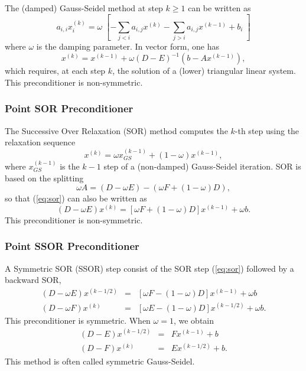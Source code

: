 The (damped) Gauss-Seidel method at step $k \geq 1$ can be written as
\[
a_{i,i} x^{(k)}_i = \omega \; 
 \left[- \sum_{j<i} a_{i,j} x^{(k)} 
			   - \sum_{j>i} a_{i,j} x^{(k-1)} + b_i
			   \; \right]
\]
where $\omega$ is the damping parameter. In vector form, one has
\begin{equation}
\label{eq:gs}
x^{(k)} = x^{(k-1)} + \omega (D - E)^{-1} (b - A x ^{(k-1)} ) ,
\end{equation}
which requires, at each step $k$, the solution of a (lower) triangular 
linear system. This preconditioner is non-symmetric.

\subsubsection{Point SOR Preconditioner}
\label{sec:sor}

The Successive Over Relaxation (SOR) method computes the $k$-th step 
using the relaxation sequence
\begin{equation}
\label{eq:sor}
x^{(k)} = \omega x_{GS}^{(k-1)} + (1 - \omega) x^{(k-1)}, 
\end{equation}
where $x_{GS}^{(k-1)}$ is the $k-1$ step of a (non-damped) Gauss-Seidel
iteration. SOR is based on the splitting 
\[
\omega A = (D - \omega E) - (\omega F + (1 - \omega) D ) ,
\]
so that (\ref{eq:sor}) can also be written as
\[
(D - \omega E) x^{(k)} = \left[
\omega F + (1 - \omega ) D
\right] x^{(k-1)} + \omega b.
\]
This preconditioner is non-symmetric.

\subsubsection{Point SSOR Preconditioner}
\label{sec:ssor}

A Symmetric SOR (SSOR) step consist of the SOR step (\ref{eq:sor}) followed by
a backward SOR,
\begin{equation}
\label{eq:ssor}
\begin{array}{rcl}
(D - \omega E) x^{(k-1/2)} &= &[ \omega F - (1 - \omega)D] x^{(k-1)} + \omega b \\
(D - \omega F) x^{(k)} &=& [ \omega E - (1 - \omega)D] x^{(k-1/2)} + \omega b .
\end{array}
\end{equation}
This preconditioner is symmetric. When $\omega = 1$, we obtain
\begin{equation}
\label{eq:sgs}
\begin{array}{rcl}
(D - E) x^{(k-1/2)} &= & F x^{(k-1)} + b \\
(D - F) x^{(k)}     &= & E  x^{(k-1/2)} + b .
\end{array}
\end{equation}
This method
is often called symmetric Gauss-Seidel.

